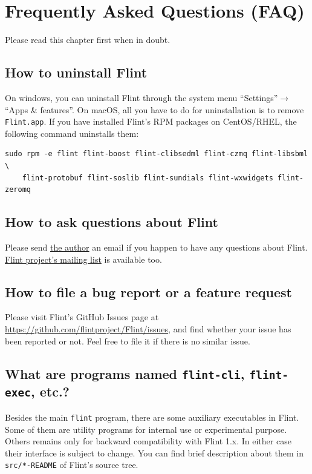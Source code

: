 \documentclass[a4paper,10pt]{report}
\begin{document}
\chapter{Frequently Asked Questions (FAQ)}
\label{sec:org47abe9e}
Please read this chapter first when in doubt.

\section{How to uninstall Flint}
\label{sec:org592a7ab}
On windows, you can uninstall Flint through the system menu ``Settings''\(\to\)``Apps \& features''.
On macOS, all you have to do for uninstallation is to remove \texttt{Flint.app}.
If you have installed Flint's RPM packages on CentOS/RHEL, the following command
uninstalls them:
\begin{verbatim}
sudo rpm -e flint flint-boost flint-clibsedml flint-czmq flint-libsbml \
    flint-protobuf flint-soslib flint-sundials flint-wxwidgets flint-zeromq
\end{verbatim}

\section{How to ask questions about Flint}
\label{sec:org3570a2e}
Please send \href{mailto:tabe@fixedpoint.jp}{the author} an email if you happen to have any questions about Flint.
\href{https://groups.google.com/g/flint-discuss}{Flint project's mailing list} is available too.

\section{How to file a bug report or a feature request}
\label{sec:org32340ec}
Please visit Flint's GitHub Issues page at
\url{https://github.com/flintproject/Flint/issues},
and find whether your issue has been reported or not.
Feel free to file it if there is no similar issue.

\section{What are programs named \texttt{flint-cli}, \texttt{flint-exec}, etc.?}
\label{sec:org559c76f}
Besides the main \texttt{flint} program, there are some auxiliary executables in
Flint. Some of them are utility programs for internal use or experimental
purpose. Others remains only for backward compatibility with Flint 1.x. In
either case their interface is subject to change. You can find brief description about
them in \texttt{src/*-README} of Flint's source tree.
\end{document}
